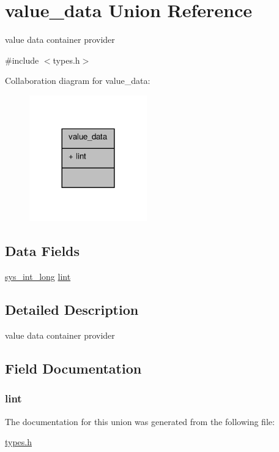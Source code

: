 \hypertarget{unionvalue__data}{\section{value\+\_\+data Union Reference}
\label{unionvalue__data}
}


value data container provider  




{\ttfamily \#include $<$types.\+h$>$}



Collaboration diagram for value\+\_\+data\+:\nopagebreak
\begin{figure}[H]
\begin{center}
\leavevmode
\includegraphics[width=144pt]{unionvalue__data__coll__graph}
\end{center}
\end{figure}
\subsection*{Data Fields}
\begin{DoxyCompactItemize}
\item 
\hyperlink{types_8h_a5b2030ae244cd6621f11f4bf6d181dbf}{sys\+\_\+int\+\_\+long} \hyperlink{unionvalue__data_a16d792f39cc926e4b92c279ab3aa68eb}{lint}
\end{DoxyCompactItemize}


\subsection{Detailed Description}
value data container provider 

\subsection{Field Documentation}
\hypertarget{unionvalue__data_a16d792f39cc926e4b92c279ab3aa68eb}{
\subsubsection[{lint}]{ lint}}\label{unionvalue__data_a16d792f39cc926e4b92c279ab3aa68eb}


The documentation for this union was generated from the following file\+:\begin{DoxyCompactItemize}
\item 
\hyperlink{types_8h}{types.\+h}\end{DoxyCompactItemize}

